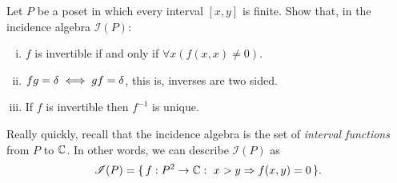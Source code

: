 \documentclass[12pt]{memoir}
\begin{document}

\begin{Ej}[Exercise 2]
    Let $P$ be a poset in which every interval $[x, y]$ is finite. Show that, in the incidence algebra $\mathscr{I}(P)$:
    \vspace*{-0.4em}
    \begin{enumerate}[i)]
        \itemsep=-0.4em
        \item $f$ is invertible if and only if $\forall x(f(x,x)\neq 0)$.
        \item $fg=\delta\iff gf=\delta$, this is, inverses are two sided.
        \item If $f$ is invertible then $f^{-1}$ is unique.
    \end{enumerate}
\end{Ej}

Really quickly, recall that the incidence algebra is the set of \emph{interval functions} from $P$ to $\mathbb{C}$. In other words, we can describe $\mathscr{I}(P)$ as 
$$\mathscr{I}(P)=\set{f:P^2\to\bC:\ x>y\To f(x,y)=0}.$$
\end{document}
